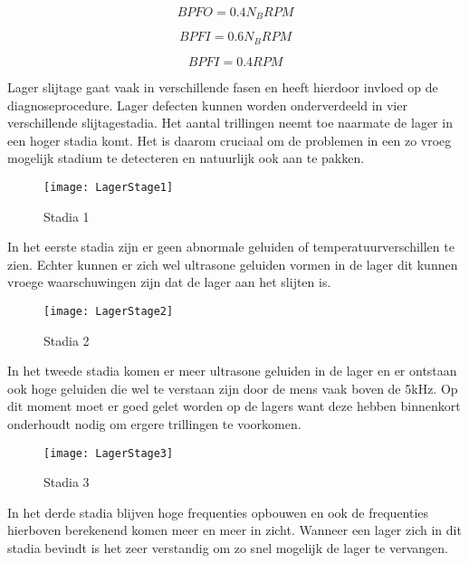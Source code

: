 \begin{equation}
	BPFO=0.4N_B RPM
\end{equation}

\begin{equation}
	BPFI=0.6N_B RPM
\end{equation}

\begin{equation}
	BPFI=0.4RPM
\end{equation}

Lager slijtage gaat vaak in verschillende fasen en heeft hierdoor invloed op de diagnoseprocedure. Lager defecten kunnen worden onderverdeeld in vier verschillende slijtagestadia. Het aantal trillingen neemt toe naarmate de lager in een hoger stadia komt. Het is daarom cruciaal om de problemen in een zo vroeg mogelijk stadium te detecteren en natuurlijk ook aan te pakken.

\begin{figure}[H]
	\centering
	\texttt{[image: LagerStage1]}
	\label{fig:LagerStage1}
	\caption{Stadia 1 \cite{web:BearingFault}}
\end{figure}

In het eerste stadia zijn er geen abnormale geluiden of temperatuurverschillen te zien. Echter kunnen er zich wel ultrasone geluiden vormen in de lager dit kunnen vroege waarschuwingen zijn dat de lager aan het slijten is.

\begin{figure}[H]
	\centering
	\texttt{[image: LagerStage2]}
	\label{fig:LagerStage2}
	\caption{Stadia 2 \cite{web:BearingFault}}
\end{figure}

In het tweede stadia komen er meer ultrasone geluiden in de lager en er ontstaan ook hoge geluiden die wel te verstaan zijn door de mens vaak boven de 5kHz. Op dit moment moet er goed gelet worden op de lagers want deze hebben binnenkort onderhoudt nodig om ergere trillingen te voorkomen.

\begin{figure}[H]
	\centering
	\texttt{[image: LagerStage3]}
	\label{fig:LagerStage3}
	\caption{Stadia 3 \cite{web:BearingFault}}
\end{figure}

In het derde stadia blijven hoge frequenties opbouwen en ook de frequenties hierboven berekenend komen meer en meer in zicht. Wanneer een lager zich in dit stadia bevindt is het zeer verstandig om zo snel mogelijk de lager te vervangen.

